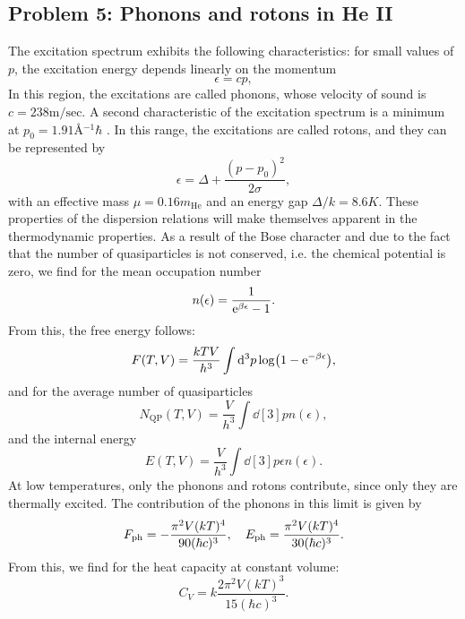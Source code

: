 \documentclass[10pt]{article}
\begin{document}
\subsection{Problem 5: Phonons and rotons in He II}
The excitation spectrum exhibits the following characteristics: for small values of $p$, the excitation energy depends linearly on the momentum 
\begin{equation}
	\epsilon = c p,
\end{equation}
In this region, the excitations are called phonons, whose velocity of sound is $c = 238\mathrm{m/sec}$. A second characteristic of the excitation spectrum is a minimum at $p_0 = 1.91 \si{\angstrom^{-1}} \hbar$ . In this range, the excitations are called rotons, and they can be represented by
\begin{equation}
	\epsilon = \Delta + \frac{(p-p_0)^2}{2\sigma},
\end{equation}
with an effective mass $μ = 0.16 m_{\text{He}}$ and an energy gap $\Delta/k = 8.6 \si{K}$. These properties of the dispersion relations will make themselves apparent in the thermodynamic properties. As a result of the Bose character and due to the fact that the number of quasiparticles is not conserved, i.e. the chemical potential is zero, we find for the mean occupation number
\begin{equation}
	n(\epsilon) = \frac{1}{{\mathrm{e}}^{\beta \epsilon} - 1}.
\end{equation}
From this, the free energy follows:
\begin{equation}
	F(T,V) = \frac{kTV}{h^3} \int \dd[3]{p} \log(1 - {\mathrm{e}}^{-\beta \epsilon}),
\end{equation}
and for the average number of quasiparticles 
\begin{equation}
	N_{\text{QP}}(T,V) = \frac{V}{h^3} \int \dd[3]{p} n(\epsilon),
\end{equation}
and the internal energy 
\begin{equation}
	E(T,V) = \frac{V}{h^3} \int \dd[3]{p} \epsilon n(\epsilon).
\end{equation}
At low temperatures, only the phonons and rotons contribute, since only they are thermally excited. The contribution of the phonons in this limit is given by
\begin{equation}
	F_{\text{ph}} = - \frac{\pi^2 V (kT)^4}{90(\hbar c)^3}\qc E_{\text{ph}} =  \frac{\pi^2 V (kT)^4}{30(\hbar c)^3}.
\end{equation}
From this, we find for the heat capacity at constant volume:
\begin{equation}
	C_V = k\frac{2\pi^2 V (kT)^3}{15(\hbar c)^3}.
\end{equation}
\end{document}
